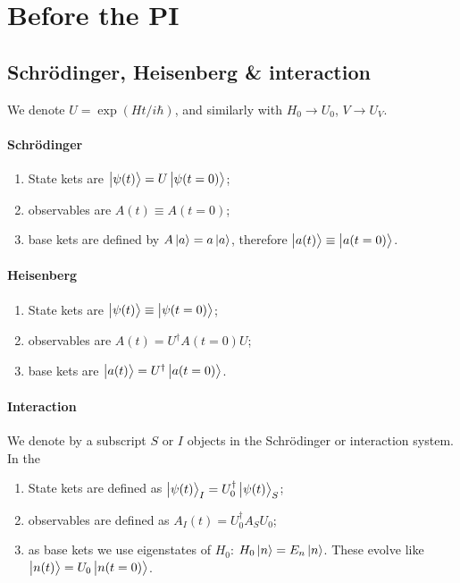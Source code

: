 \documentclass[main.tex]{subfiles}
\begin{document}
\section{Before the PI}

\subsection{Schrödinger, Heisenberg \& interaction}

We denote \(U = \exp(Ht/i \hbar) \), and similarly with \(H_0 \rightarrow U_0 \), \(V \rightarrow U_V\).

\paragraph{Schrödinger}

\begin{enumerate}
    \item State kets are \(\ket{\psi (t)} = U \ket{\psi (t = 0)}  \);
    \item observables are \(A(t) \equiv A(t=0)\);
    \item base kets are defined by \(A \ket{a} = a \ket{a} \), therefore \(\ket{a(t)} \equiv \ket{a(t=0)} \).
\end{enumerate}

\paragraph{Heisenberg}

\begin{enumerate}
    \item State kets are \(\ket{\psi (t)} \equiv \ket{\psi (t=0)} \);
    \item observables are \(A(t) = U ^\dag A(t=0) U \);
    \item base kets are \(\ket{a(t)} = U ^\dag \ket{a(t=0)} \).
\end{enumerate}
    

\paragraph{Interaction}

We denote by a subscript \(S\) or \(I\) objects in the Schrödinger or interaction system. In the 

\begin{enumerate}
    \item State kets are defined as \(\ket{\psi (t)}_I = U_0 ^\dag \ket{\psi (t)}_S \);
    \item observables are defined as \(A_I (t) = U_0 ^\dag A_S U_0 \);
    \item as base kets we use eigenstates of \(H_0 \): \(H_0 \ket{n} = E_n \ket{n} \). These evolve like \(\ket{n(t)} = U_0 \ket{n(t= 0)} \).
\end{enumerate}
\end{document}
